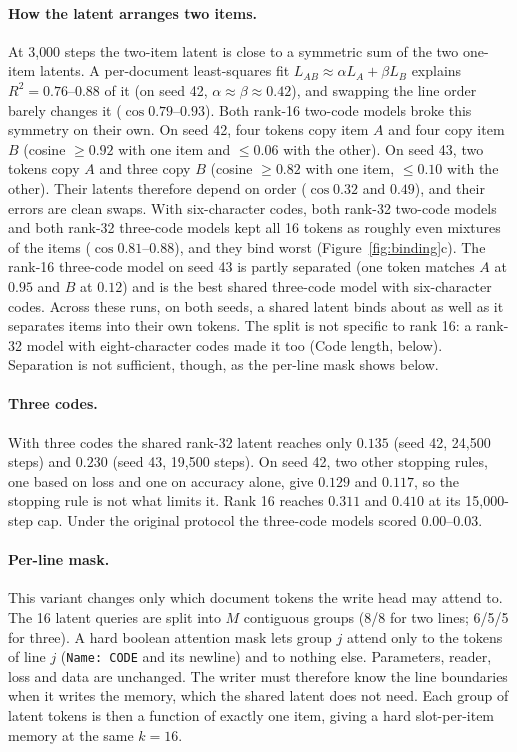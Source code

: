 \paragraph{How the latent arranges two items.} At 3{,}000 steps the two-item latent is close to a symmetric sum of the two one-item latents. A per-document least-squares fit $L_{AB}\approx\alpha L_A+\beta L_B$ explains $R^2{=}0.76$--$0.88$ of it (on seed 42, $\alpha\approx\beta\approx0.42$), and swapping the line order barely changes it ($\cos 0.79$--$0.93$). Both rank-16 two-code models broke this symmetry on their own. On seed 42, four tokens copy item $A$ and four copy item $B$ (cosine $\geq0.92$ with one item and $\leq0.06$ with the other). On seed 43, two tokens copy $A$ and three copy $B$ (cosine $\geq0.82$ with one item, $\leq0.10$ with the other). Their latents therefore depend on order ($\cos 0.32$ and $0.49$), and their errors are clean swaps. With six-character codes, both rank-32 two-code models and both rank-32 three-code models kept all 16 tokens as roughly even mixtures of the items ($\cos 0.81$--$0.88$), and they bind worst (Figure~\ref{fig:binding}c). The rank-16 three-code model on seed 43 is partly separated (one token matches $A$ at $0.95$ and $B$ at $0.12$) and is the best shared three-code model with six-character codes. Across these runs, on both seeds, a shared latent binds about as well as it separates items into their own tokens. The split is not specific to rank 16: a rank-32 model with eight-character codes made it too (Code length, below). Separation is not sufficient, though, as the per-line mask shows below.

\paragraph{Three codes.} With three codes the shared rank-32 latent reaches only $0.135$ (seed 42, 24{,}500 steps) and $0.230$ (seed 43, 19{,}500 steps). On seed 42, two other stopping rules, one based on loss and one on accuracy alone, give $0.129$ and $0.117$, so the stopping rule is not what limits it. Rank 16 reaches $0.311$ and $0.410$ at its 15{,}000-step cap. Under the original protocol the three-code models scored $0.00$--$0.03$.

\paragraph{Per-line mask.} This variant changes only which document tokens the write head may attend to. The 16 latent queries are split into $M$ contiguous groups (8/8 for two lines; 6/5/5 for three). A hard boolean attention mask lets group $j$ attend only to the tokens of line $j$ (\texttt{Name: CODE} and its newline) and to nothing else. Parameters, reader, loss and data are unchanged. The writer must therefore know the line boundaries when it writes the memory, which the shared latent does not need. Each group of latent tokens is then a function of exactly one item, giving a hard slot-per-item memory at the same $k{=}16$.

